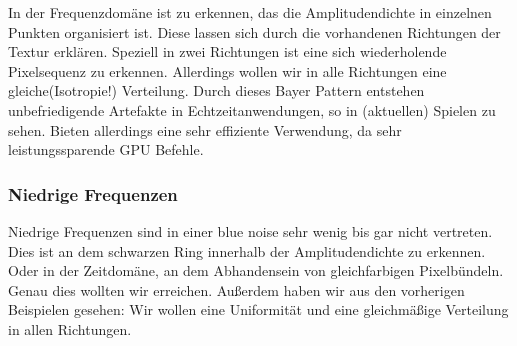In der Frequenzdomäne ist zu erkennen, das die Amplitudendichte in einzelnen
Punkten organisiert ist. Diese lassen sich durch die vorhandenen
Richtungen der Textur erklären. Speziell in zwei Richtungen ist eine sich
wiederholende Pixelsequenz zu erkennen.
Allerdings wollen wir in alle Richtungen eine gleiche(Isotropie!) 
Verteilung. Durch dieses Bayer Pattern entstehen unbefriedigende 
Artefakte in Echtzeitanwendungen, so in (aktuellen) Spielen 
\cite{bluenoisewronski} zu sehen. Bieten allerdings eine sehr effiziente
Verwendung, da sehr leistungssparende GPU Befehle.

\subsubsection{Niedrige Frequenzen}

Niedrige Frequenzen sind in einer blue noise sehr wenig bis gar nicht 
vertreten. Dies ist an dem schwarzen Ring innerhalb der Amplitudendichte
zu erkennen. Oder in der Zeitdomäne, an dem 
Abhandensein von gleichfarbigen Pixelbündeln. Genau dies wollten wir 
erreichen.
Außerdem haben wir aus den vorherigen Beispielen gesehen: Wir wollen 
eine Uniformität  und eine gleichmäßige Verteilung
in allen Richtungen.

